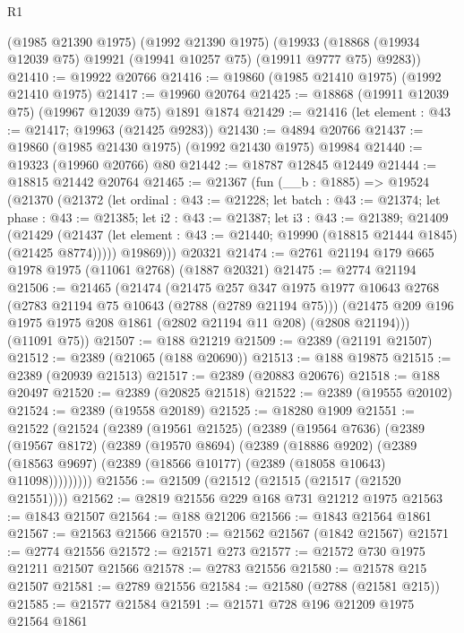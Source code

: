 \begin{lexlean}{R1}
\begin{coremodule}
    (@1985 @21390 @1975)
    (@1992 @21390 @1975)
    (@19933 (@18868 (@19934 @12039 @75) @19921 (@19941 @10257 @75) (@19911 @9777 @75) @9283))
@21410 := @19922 @20766
@21416 := @19860 (@1985 @21410 @1975) (@1992 @21410 @1975)
@21417 := @19960 @20764
@21425 := @18868 (@19911 @12039 @75) (@19967 @12039 @75) @1891 @1874
@21429 := @21416 (let element : @43 := @21417; @19963 (@21425 @9283))
@21430 := @4894 @20766
@21437 := @19860 (@1985 @21430 @1975) (@1992 @21430 @1975) @19984
@21440 := @19323 (@19960 @20766) @80
@21442 := @18787 @12845 @12449
@21444 := @18815 @21442 @20764
@21465 := @21367
    (fun (__b : @1885) =>
    @19524
      (@21370
        (@21372
          (let ordinal : @43 := @21228;
          let batch : @43 := @21374;
          let phase : @43 := @21385;
          let i2 : @43 := @21387;
          let i3 : @43 := @21389;
          @21409
            (@21429
              (@21437 (let element : @43 := @21440; @19990 (@18815 @21444 @1845) (@21425 @8774)))))
          @19869)))
    @20321
@21474 := @2761 @21194 @179 @665 @1978 @1975 (@11061 @2768) (@1887 @20321)
@21475 := @2774 @21194
@21506 := @21465
    (@21474
      (@21475
        @257
        @347
        @1975
        @1977
        @10643
        @2768
        (@2783 @21194 @75 @10643 (@2788 (@2789 @21194 @75)))
        (@21475 @209 @196 @1975 @1975 @208 @1861 (@2802 @21194 @11 @208) (@2808 @21194)))
      (@11091 @75))
@21507 := @188 @21219
@21509 := @2389 (@21191 @21507)
@21512 := @2389 (@21065 (@188 @20690))
@21513 := @188 @19875
@21515 := @2389 (@20939 @21513)
@21517 := @2389 (@20883 @20676)
@21518 := @188 @20497
@21520 := @2389 (@20825 @21518)
@21522 := @2389 (@19555 @20102)
@21524 := @2389 (@19558 @20189)
@21525 := @18280 @1909
@21551 := @21522
    (@21524
      (@2389
        (@19561 @21525)
        (@2389
          (@19564 @7636)
          (@2389
            (@19567 @8172)
            (@2389
              (@19570 @8694)
              (@2389
                (@18886 @9202)
                (@2389 (@18563 @9697) (@2389 (@18566 @10177) (@2389 (@18058 @10643) @11098)))))))))
@21556 := @21509 (@21512 (@21515 (@21517 (@21520 @21551))))
@21562 := @2819 @21556 @229 @168 @731 @21212 @1975
@21563 := @1843 @21507
@21564 := @188 @21206
@21566 := @1843 @21564 @1861
@21567 := @21563 @21566
@21570 := @21562 @21567 (@1842 @21567)
@21571 := @2774 @21556
@21572 := @21571 @273
@21577 := @21572 @730 @1975 @21211 @21507 @21566
@21578 := @2783 @21556
@21580 := @21578 @215 @21507
@21581 := @2789 @21556
@21584 := @21580 (@2788 (@21581 @215))
@21585 := @21577 @21584
@21591 := @21571 @728 @196 @21209 @1975 @21564 @1861

\end{coremodule}
\end{lexlean}
